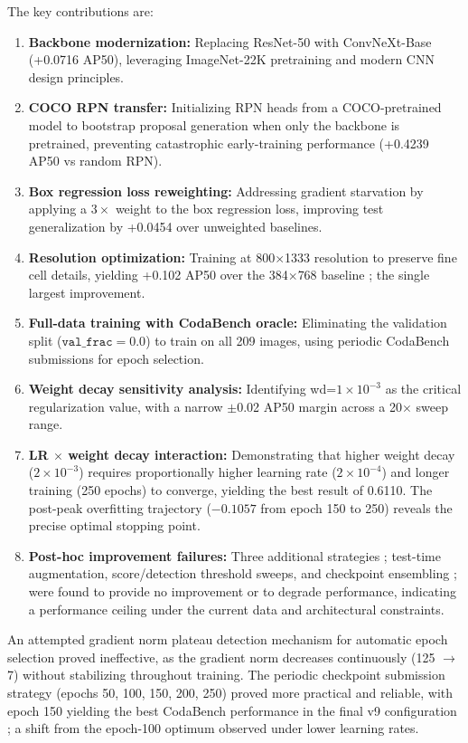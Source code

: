 \documentclass[12pt, a4paper]{article}
\begin{document}
The key contributions are:
\begin{enumerate}
    \item \textbf{Backbone modernization:} Replacing ResNet-50 with ConvNeXt-Base (+0.0716 AP50), leveraging ImageNet-22K pretraining and modern CNN design principles.
    \item \textbf{COCO RPN transfer:} Initializing RPN heads from a COCO-pretrained model to bootstrap proposal generation when only the backbone is pretrained, preventing catastrophic early-training performance (+0.4239 AP50 vs random RPN).
    \item \textbf{Box regression loss reweighting:} Addressing gradient starvation by applying a $3\times$ weight to the box regression loss, improving test generalization by +0.0454 over unweighted baselines.
    \item \textbf{Resolution optimization:} Training at 800$\times$1333 resolution to preserve fine cell details, yielding +0.102 AP50 over the 384$\times$768 baseline ; the single largest improvement.
    \item \textbf{Full-data training with CodaBench oracle:} Eliminating the validation split ($\texttt{val\_frac}=0.0$) to train on all 209 images, using periodic CodaBench submissions for epoch selection.
    \item \textbf{Weight decay sensitivity analysis:} Identifying wd=$1 \times 10^{-3}$ as the critical regularization value, with a narrow $\pm$0.02 AP50 margin across a 20$\times$ sweep range.
    \item \textbf{LR $\times$ weight decay interaction:} Demonstrating that higher weight decay ($2 \times 10^{-3}$) requires proportionally higher learning rate ($2 \times 10^{-4}$) and longer training (250 epochs) to converge, yielding the best result of 0.6110. The post-peak overfitting trajectory (${-}0.1057$ from epoch 150 to 250) reveals the precise optimal stopping point.
    \item \textbf{Post-hoc improvement failures:} Three additional strategies ; test-time augmentation, score/detection threshold sweeps, and checkpoint ensembling ; were found to provide no improvement or to degrade performance, indicating a performance ceiling under the current data and architectural constraints.
\end{enumerate}

An attempted gradient norm plateau detection mechanism for automatic epoch selection proved ineffective, as the gradient norm decreases continuously (125 $\rightarrow$ 7) without stabilizing throughout training. The periodic checkpoint submission strategy (epochs 50, 100, 150, 200, 250) proved more practical and reliable, with epoch 150 yielding the best CodaBench performance in the final v9 configuration ; a shift from the epoch-100 optimum observed under lower learning rates.
\end{document}

